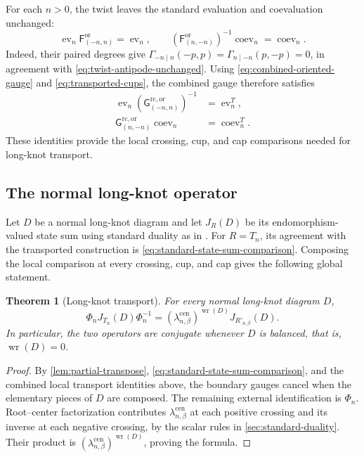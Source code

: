 \documentclass[11pt,a4paper]{article}
\newcommand{\ev}{\operatorname{ev}}
\newcommand{\coev}{\operatorname{coev}}
\newcommand{\Writhe}{\operatorname{wr}}
\newcommand{\rc}{\mathrm{rc}}
\newcommand{\cen}{\mathrm{cen}}
\newtheorem{theorem}{Theorem}[section]
\theoremstyle{definition}
\theoremstyle{remark}
\begin{document}
For each \(n>0\), the twist leaves the standard evaluation and
coevaluation unchanged:
\begin{equation}\label{eq:root-center-cups}
 \ev_n\mathsf F_{(-n,n)}^{\mathrm{or}}=\ev_n,\qquad
 (\mathsf F_{(n,-n)}^{\mathrm{or}})^{-1}\coev_n=\coev_n.
\end{equation}
Indeed, their paired degrees give
\(\Gamma_{-n\mid n}(-p,p)=\Gamma_{n\mid -n}(p,-p)=0\),
in agreement with \eqref{eq:twist-antipode-unchanged}.
Using \eqref{eq:combined-oriented-gauge} and
\eqref{eq:transported-cups}, the combined gauge therefore satisfies
\begin{align}
 \ev_n(\mathsf G_{(-n,n)}^{\rc,\mathrm{or}})^{-1}
 &=\ev_n^T,\label{eq:root-center-evaluation-cancels}\\
 \mathsf G_{(n,-n)}^{\rc,\mathrm{or}}\coev_n
 &=\coev_n^T.\label{eq:root-center-coevaluation-cancels}
\end{align}
These identities provide the local crossing, cup, and cap comparisons
needed for long-knot transport.

\subsection{The normal long-knot operator}

Let \(D\) be a normal long-knot diagram and let \(J_R(D)\) be its
endomorphism-valued state sum using standard duality as in
\cite[Section~2]{GK}.  For \(R=T_n\), its agreement with the
transported construction is \eqref{eq:standard-state-sum-comparison}.
Composing the local comparison
at every crossing, cup, and cap gives the following global statement.

\begin{theorem}[Long-knot transport]\label{thm:rigid}
For every normal long-knot diagram \(D\),
\begin{equation}\label{eq:long-transport}
 \Phi_nJ_{T_n}(D)\Phi_n^{-1}
 =
 (\lambda_{n,\beta}^{\cen})^{\Writhe(D)}
 J_{R'_{n,\beta}}(D).
\end{equation}
In particular, the two operators are conjugate whenever \(D\) is
balanced, that is, \(\Writhe(D)=0\).
\end{theorem}

\begin{proof}
By \cref{lem:partial-transpose},
\eqref{eq:standard-state-sum-comparison}, and the combined local
transport identities above, the boundary gauges cancel when the
elementary pieces of \(D\) are composed.  The remaining external
identification is \(\Phi_n\).  Root--center factorization contributes
\(\lambda_{n,\beta}^{\cen}\) at each positive crossing and its inverse
at each negative crossing, by the scalar rules in
\cref{sec:standard-duality}.  Their product is
\((\lambda_{n,\beta}^{\cen})^{\Writhe(D)}\), proving the formula.
\end{proof}
\end{document}
